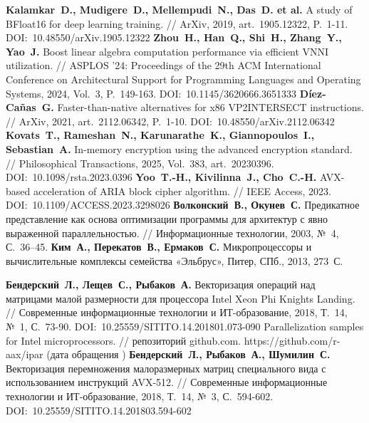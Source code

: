 \begin{thebibliography}{99}
\textbf{Kalamkar~D., Mudigere~D., Mellempudi~N., Das~D. et al.} A study of BFloat16 for deep learning training. // ArXiv, 2019, art.~1905.12322, P.~1-11. DOI:~10.48550/arXiv.1905.12322
\textbf{Zhou~H., Han~Q., Shi~H., Zhang~Y., Yao~J.} Boost linear algebra computation performance via efficient VNNI utilization. // ASPLOS '24: Proceedings of the 29th ACM International Conference on Architectural Support for Programming Languages and Operating Systems, 2024, Vol.~3, P.~149-163. DOI:~10.1145/3620666.3651333
\textbf{D{\'i}ez-Ca{\~n}as~G.} Faster-than-native alternatives for x86 VP2INTERSECT instructions. // ArXiv, 2021, art.~2112.06342, P.~1-10. DOI:~10.48550/arXiv.2112.06342
\textbf{Kovats~T., Rameshan~N., Karunarathe~K., Giannopoulos~I., Sebastian~A.} In-memory encryption using the advanced encryption standard. // Philosophical Transactions, 2025, Vol.~383, art.~20230396. DOI:~10.1098/rsta.2023.0396
\textbf{Yoo~T.-H., Kivilinna~J., Cho~C.-H.} AVX-based acceleration of ARIA block cipher algorithm. // IEEE Access, 2023. DOI:~10.1109/ACCESS.2023.3298026
\textbf{Волконский~В., Окунев~С.} Предикатное представление как основа оптимизации программы для архитектур с явно выраженной параллельностью. // Информационные технологии, 2003, №~4, С.~36–45.
\textbf{Ким~А., Перекатов~В., Ермаков~С.} Микропроцессоры и вычислительные комплексы семейства «Эльбрус», Питер, СПб., 2013, 273~С.

\textbf{Бендерский~Л., Лещев~С., Рыбаков~А.} Векторизация операций над матрицами малой размерности для процессора Intel Xeon Phi Knights Landing. // Современные информационные технологии и ИТ-образование, 2018, Т.~14, №~1, С.~73-90. DOI:~10.25559/SITITO.14.201801.073-090
Parallelization samples for Intel microprocessors. // репозиторий github.com. https://github.com/r-aax/ipar (дата обращения \StrDate)
\textbf{Бендерский~Л., Рыбаков~А., Шумилин~С.} Векторизация перемножения малоразмерных матриц специального вида с использованием инструкций AVX-512. // Современные информационные технологии и ИТ-образование, 2018, Т.~14, №~3, С.~594-602. DOI:~10.25559/SITITO.14.201803.594-602


\end{thebibliography}
